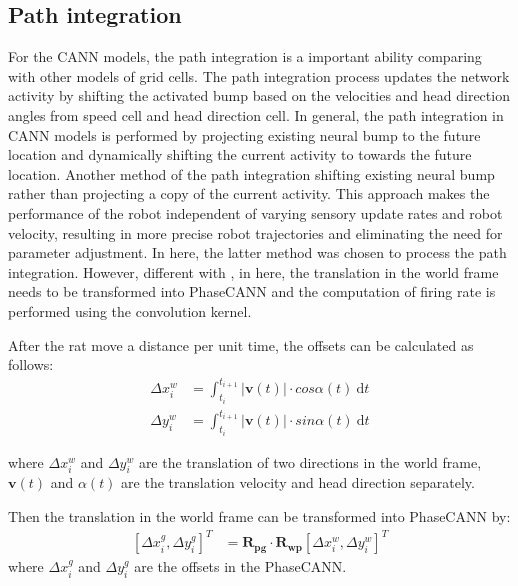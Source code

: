 \documentclass[preprint,12pt]{elsarticle}
\begin{document}
\subsection{Path integration}

For the CANN models, the path integration is a important ability comparing with other models of grid cells. The path integration process updates the network activity by shifting the activated bump based on the velocities and head direction angles from speed cell\cite{Kropff2015} and head direction cell\cite{Zhang1996,Taube1990}. In general, the path integration in CANN models is performed by projecting existing neural bump to the future location and dynamically shifting the current activity to towards the future location. Another method of the path integration shifting existing neural bump rather than projecting a copy of the current activity. This approach makes the performance of the robot independent of varying sensory update rates and robot velocity, resulting in more precise robot trajectories and eliminating the need for parameter adjustment\cite{Milford2008d}. In here, the latter method was chosen to process the path integration. However, different with \cite{Milford2008d}, in here, the translation in the world frame needs to be transformed into PhaseCANN and the computation of firing rate is performed using the convolution kernel.

After the rat move a distance per unit time, the offsets can be calculated as follows:
\begin{equation}\label{eq:offsets}
	\begin{aligned}
		\Delta x^w_i &= \int_{t_{i}}^{t_{i+1}}|\bm{v}(t)| \cdot cos\alpha(t) \ \text{d}t	\\
		\Delta y^w_i &= \int_{t_{i}}^{t_{i+1}}|\bm{v}(t)| \cdot sin\alpha(t) \ \text{d}t
	\end{aligned}
\end{equation}

where $\Delta x^w_i$ and $\Delta y^w_i$ are the translation of two directions in the world frame, $\bm{v}(t)$ and $\alpha(t)$ are the translation velocity and head direction separately.

Then the translation in the world frame can be transformed into PhaseCANN by:
\begin{align}\label{eq:trans_w2g}	
	[\Delta x^g_i,\Delta y^g_i]^T &= \bm{R_{pg}}\cdot \bm{R_{wp}} [\Delta x^w_i,\Delta y^w_i]^T 
\end{align}
where $\Delta x^g_i$ and $\Delta y^g_i$ are the offsets in the PhaseCANN.
\end{document}
